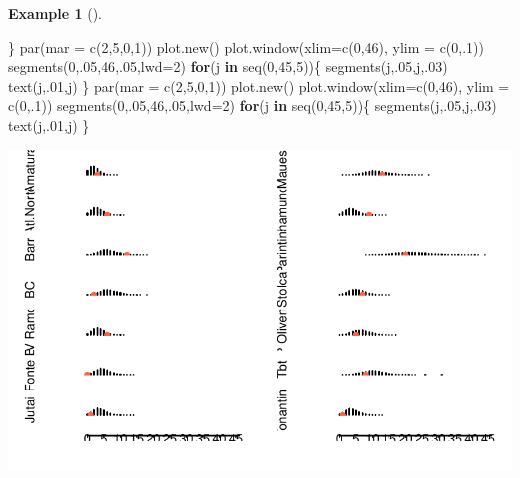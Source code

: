 \documentclass[
  letterpaper,
  DIV=11,
  numbers=noendperiod]{scrreprt}
\newenvironment{Shaded}{\begin{snugshade}}{\end{snugshade}}
\newcommand{\AttributeTok}[1]{\textcolor[rgb]{0.40,0.45,0.13}{#1}}
\newcommand{\ControlFlowTok}[1]{\textcolor[rgb]{0.00,0.23,0.31}{\textbf{#1}}}
\newcommand{\DecValTok}[1]{\textcolor[rgb]{0.68,0.00,0.00}{#1}}
\newcommand{\FunctionTok}[1]{\textcolor[rgb]{0.28,0.35,0.67}{#1}}
\newcommand{\NormalTok}[1]{\textcolor[rgb]{0.00,0.23,0.31}{#1}}
\theoremstyle{definition}
\theoremstyle{plain}
\theoremstyle{definition}
\newtheorem{example}{Example}[chapter]
\theoremstyle{remark}
\begin{document}
\begin{example}[]
\begin{Shaded}
\begin{Highlighting}[]
\NormalTok{\}}
  \FunctionTok{par}\NormalTok{(}\AttributeTok{mar =} \FunctionTok{c}\NormalTok{(}\DecValTok{2}\NormalTok{,}\DecValTok{5}\NormalTok{,}\DecValTok{0}\NormalTok{,}\DecValTok{1}\NormalTok{))}
  \FunctionTok{plot.new}\NormalTok{()}
  \FunctionTok{plot.window}\NormalTok{(}\AttributeTok{xlim=}\FunctionTok{c}\NormalTok{(}\DecValTok{0}\NormalTok{,}\DecValTok{46}\NormalTok{), }\AttributeTok{ylim =} \FunctionTok{c}\NormalTok{(}\DecValTok{0}\NormalTok{,.}\DecValTok{1}\NormalTok{))}
  \FunctionTok{segments}\NormalTok{(}\DecValTok{0}\NormalTok{,.}\DecValTok{05}\NormalTok{,}\DecValTok{46}\NormalTok{,.}\DecValTok{05}\NormalTok{,}\AttributeTok{lwd=}\DecValTok{2}\NormalTok{)}
 \ControlFlowTok{for}\NormalTok{(j }\ControlFlowTok{in} \FunctionTok{seq}\NormalTok{(}\DecValTok{0}\NormalTok{,}\DecValTok{45}\NormalTok{,}\DecValTok{5}\NormalTok{))\{}
    \FunctionTok{segments}\NormalTok{(j,.}\DecValTok{05}\NormalTok{,j,.}\DecValTok{03}\NormalTok{)}
    \FunctionTok{text}\NormalTok{(j,.}\DecValTok{01}\NormalTok{,j)}
\NormalTok{  \}}
    \FunctionTok{par}\NormalTok{(}\AttributeTok{mar =} \FunctionTok{c}\NormalTok{(}\DecValTok{2}\NormalTok{,}\DecValTok{5}\NormalTok{,}\DecValTok{0}\NormalTok{,}\DecValTok{1}\NormalTok{))}
  \FunctionTok{plot.new}\NormalTok{()}
  \FunctionTok{plot.window}\NormalTok{(}\AttributeTok{xlim=}\FunctionTok{c}\NormalTok{(}\DecValTok{0}\NormalTok{,}\DecValTok{46}\NormalTok{), }\AttributeTok{ylim =} \FunctionTok{c}\NormalTok{(}\DecValTok{0}\NormalTok{,.}\DecValTok{1}\NormalTok{))}
  \FunctionTok{segments}\NormalTok{(}\DecValTok{0}\NormalTok{,.}\DecValTok{05}\NormalTok{,}\DecValTok{46}\NormalTok{,.}\DecValTok{05}\NormalTok{,}\AttributeTok{lwd=}\DecValTok{2}\NormalTok{)}
  \ControlFlowTok{for}\NormalTok{(j }\ControlFlowTok{in} \FunctionTok{seq}\NormalTok{(}\DecValTok{0}\NormalTok{,}\DecValTok{45}\NormalTok{,}\DecValTok{5}\NormalTok{))\{}
    \FunctionTok{segments}\NormalTok{(j,.}\DecValTok{05}\NormalTok{,j,.}\DecValTok{03}\NormalTok{)}
    \FunctionTok{text}\NormalTok{(j,.}\DecValTok{01}\NormalTok{,j)}
\NormalTok{  \}}
\end{Highlighting}
\end{Shaded}

\includegraphics{poisson_files/figure-pdf/unnamed-chunk-4-1.pdf}


\end{example}
\end{document}
